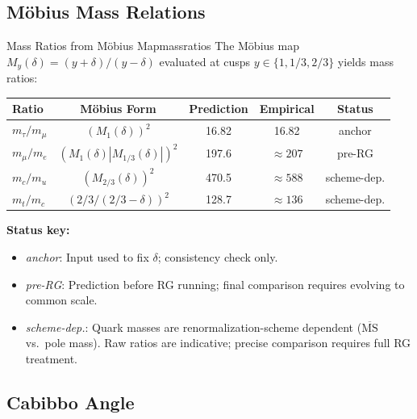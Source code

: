 \subsection{M\"obius Mass Relations}

\begin{corollary}{Mass Ratios from M\"obius Map}{massratios}
The M\"obius map $M_y(\delta) = (y + \delta)/(y - \delta)$ evaluated at 
cusps $y \in \{1, 1/3, 2/3\}$ yields mass ratios:

\begin{center}
\begin{tabular}{@{}lcccc@{}}
\toprule
\textbf{Ratio} & \textbf{M\"obius Form} & \textbf{Prediction} & \textbf{Empirical} & \textbf{Status}\\
\midrule
$m_\tau/m_\mu$ & $(M_1(\delta))^2$ & 16.82 & 16.82 & anchor\\
$m_\mu/m_e$ & $(M_1(\delta)|M_{1/3}(\delta)|)^2$ & 197.6 & $\approx 207$ & pre-RG\\
$m_c/m_u$ & $(M_{2/3}(\delta))^2$ & 470.5 & $\approx 588$ & scheme-dep.\\
$m_t/m_c$ & $(2/3/(2/3-\delta))^2$ & 128.7 & $\approx 136$ & scheme-dep.\\
\bottomrule
\end{tabular}
\end{center}

\textbf{Status key:}
\begin{itemize}[leftmargin=1.5em, topsep=2pt, itemsep=1pt]
    \item \textit{anchor}: Input used to fix $\delta$; consistency check only.
    \item \textit{pre-RG}: Prediction before RG running; final comparison requires 
        evolving to common scale.
    \item \textit{scheme-dep.}: Quark masses are renormalization-scheme dependent 
        ($\overline{\text{MS}}$ vs.\ pole mass). Raw ratios are indicative; 
        precise comparison requires full RG treatment.
\end{itemize}
\end{corollary}

\subsection{Cabibbo Angle}

